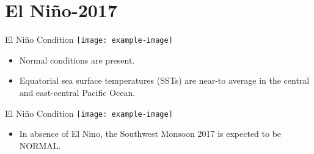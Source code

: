 \documentclass[handout,t]{beamer}
\begin{document}
\section{El Niño-2017}
\begin{frame}{El Niño Condition}
\centering
\texttt{[image: example-image]}
\begin{itemize}
    \item Normal conditions are present.

    \item Equatorial sea surface temperatures (SSTs) are near-to average in the central and east-central Pacific Ocean. 

\end{itemize}
\end{frame}
\begin{frame}[c]{El Niño Condition}
\centering
\vspace{3pt}
\texttt{[image: example-image]}
\begin{itemize}
    \vspace{3pt}
    \item In absence of El Nino, the Southwest Monsoon 2017 is expected to be NORMAL.

\end{itemize}
\end{frame}

\end{document}
